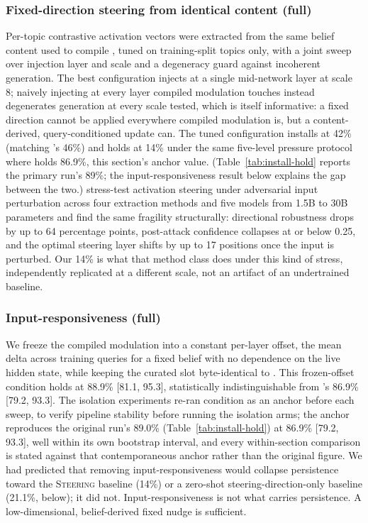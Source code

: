 \subsubsection{Fixed-direction steering from identical content (full)}

Per-topic contrastive activation vectors were extracted from the same belief content
used to compile \condF{}, tuned on training-split topics only, with a joint
sweep over injection layer and scale and a degeneracy guard against incoherent
generation. The best configuration injects at a single mid-network layer at scale 8;
naively injecting at every layer compiled modulation touches instead degenerates
generation at every scale tested, which is itself informative: a fixed direction cannot
be applied everywhere compiled modulation is, but a content-derived, query-conditioned
update can. The tuned configuration installs at 42\% (matching \condC{}'s 46\%) and holds
at 14\% under the same five-level pressure protocol where \condF{} holds
86.9\%, this section's anchor value. (Table~\ref{tab:install-hold}
reports the primary run's 89\%; the input-responsiveness result below explains the gap
between the two.) \citet{le2026steeringrobustness} stress-test activation steering
under adversarial input perturbation across four extraction methods and five models
from 1.5B to 30B parameters and find the same fragility structurally: directional
robustness drops by up to 64 percentage points, post-attack confidence collapses at or
below 0.25, and the optimal steering layer shifts by up to 17 positions once the input
is perturbed. Our 14\% is what that method class does under this kind of stress,
independently replicated at a different scale, not an artifact of an undertrained
baseline.

\subsubsection{Input-responsiveness (full)}

We freeze the compiled modulation into a constant per-layer offset, the mean delta
across training queries for a fixed belief with no dependence on the live hidden state,
while keeping the curated slot byte-identical to \condF{}. This frozen-offset condition
holds at 88.9\% [81.1, 95.3], statistically indistinguishable from \condF{}'s 86.9\%
[79.2, 93.3]. The isolation experiments re-ran condition \condF{} as
an anchor before each sweep, to verify pipeline stability before running the isolation
arms; the anchor reproduces the original run's 89.0\% (Table~\ref{tab:install-hold}) at
86.9\% [79.2, 93.3], well within its own bootstrap interval, and every within-section
comparison is stated against that contemporaneous anchor rather than the original
figure. We had predicted that removing input-responsiveness would collapse persistence
toward the \textsc{Steering} baseline (14\%) or a zero-shot steering-direction-only
baseline (21.1\%, below); it did not. Input-responsiveness is not what carries
persistence. A low-dimensional, belief-derived fixed nudge is sufficient.

